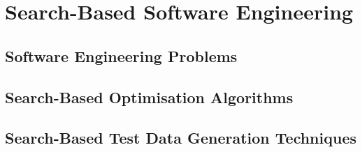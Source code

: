 \chapter{Search-Based Software Engineering}
\section{Software Engineering Problems}
\section{Search-Based Optimisation Algorithms}
\section{Search-Based Test Data Generation Techniques}